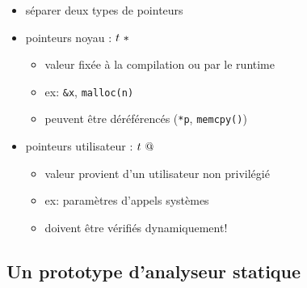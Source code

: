 \documentclass{beamer}
\begin{document}
\begin{frame}

\begin{itemize}
\item séparer deux types de pointeurs
\item pointeurs noyau : $\ptrK{t}$

  \begin{itemize}
  \item valeur fixée à la compilation ou par le runtime
  \item ex: \texttt{\&x}, \texttt{malloc(n)}
  \item peuvent être déréférencés (\texttt{*p}, \texttt{memcpy()})
  \end{itemize}
\item pointeurs utilisateur : $\ptrU{t}$

  \begin{itemize}
  \item valeur provient d'un utilisateur non privilégié
  \item ex: paramètres d'appels systèmes
  \item doivent être vérifiés dynamiquement!
  \end{itemize}
\end{itemize}

\end{frame}

\begin{frame}
    \begin{mathpar}



    \end{mathpar}
\end{frame}

\subsection{Un prototype d'analyseur statique}
\end{document}

